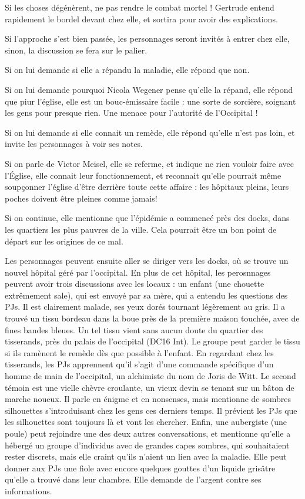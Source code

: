 \documentclass[10pt,a4paper]{article}
\begin{document}
Si les choses dégénèrent, ne pas rendre le combat mortel ! Gertrude entend rapidement le bordel devant chez elle, et sortira pour avoir des explications.

Si l'approche s'est bien passée, les personnages seront invités à entrer chez elle, sinon, la discussion se fera sur le palier.

Si on lui demande si elle a répandu la maladie, elle répond que non.

Si on lui demande pourquoi Nicola Wegener pense qu'elle la répand, elle répond que piur l'église, elle est un bouc-émissaire facile : une sorte de sorcière, soignant les gens pour presque rien. Une menace pour l'autorité de l'Occipital !

Si on lui demande si elle connait un remède, elle répond qu'elle n'est pas loin, et invite les personnages à voir ses notes.

Si on parle de Victor Meisel, elle se referme, et indique ne rien vouloir faire avec l'Église, elle connait leur fonctionnement, et reconnait qu'elle pourrait même soupçonner l'église d'être derrière toute cette affaire : les hôpitaux pleins, leurs poches doivent être pleines comme jamais!

Si on continue, elle mentionne que l'épidémie a commencé près des docks, dans les quartiers les plus pauvres de la ville. Cela pourrait être un bon point de départ sur les origines de ce mal.

Les personnages peuvent ensuite aller se diriger vers les docks, où se trouve un nouvel hôpital géré par l'occipital. En plus de cet hôpital, les perosnnages peuvent avoir trois discussions avec les locaux : un enfant (une chouette extrêmement sale), qui est envoyé par sa mère, qui a entendu les questions des PJs. Il est clairement malade, ses yeux dorés tournant légèrement au gris. Il a trouvé un tissu bordeau dans la boue près de la première maison touchée, avec de fines bandes bleues. Un tel tissu vient sans aucun doute du quartier des tisserands, près du palais de l'occipital (DC16 Int). Le groupe peut garder le tissu si ils ramènent le remède dès que possible à l'enfant. En regardant chez les tisserands, les PJs apprennent qu'il s'agit d'une commande spécifique d'un homme de main de l'occipital, un alchimiste du nom de Joris de Witt. Le second témoin est une vielle chèvre croulante, un vieux devin se tenant sur un bâton de marche noueux. Il parle en énigme et en nonsenses, mais mentionne de sombres silhouettes s'introduisant chez les gens ces derniers temps. Il prévient les PJs que les silhouettes sont toujours là et vont les chercher. Enfin, une aubergiste (une poule) peut rejoindre une des deux autres conversations, et mentionne qu'elle a hébergé un groupe d'individus avec de grandes capes sombres, qui souhaitaient rester discrets, mais elle craint qu'ils n'aient un lien avec la maladie. Elle peut donner aux PJs une fiole avec encore quelques gouttes d'un liquide grisâtre qu'elle a trouvé dans leur chambre. Elle demande de l'argent contre ses informations.
\end{document}
